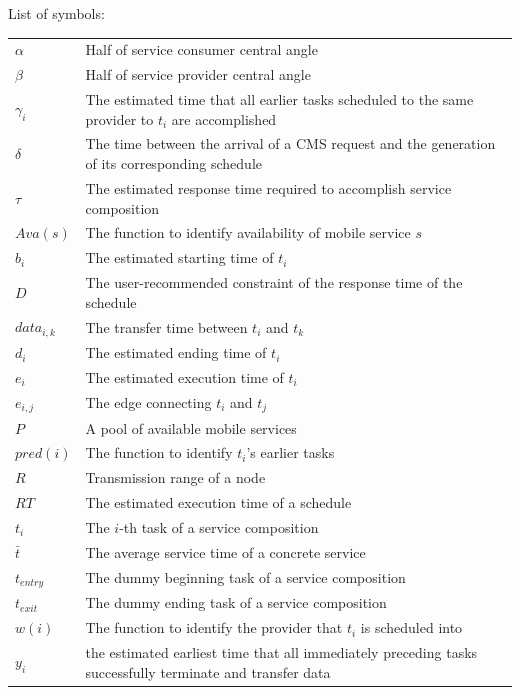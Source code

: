 \documentclass[journal]{IEEEtran}
\begin{document}
\noindent List of symbols: 
~\\

\noindent
\begin{tabular}{@{} l p{7.36cm} }
$\alpha$      &   Half of service consumer central angle \\
$\beta$       &   Half of service provider central angle \\
$\gamma_{i}$  &   The estimated time that all earlier tasks scheduled to the same provider to $t_i$ are accomplished  \\
$\delta$      &   The time between the arrival of a CMS request and the generation of its corresponding schedule \\
$\tau$        &   The estimated response time required to accomplish service composition \\
$Ava(s)$      &   The function to identify availability of mobile service $s$ \\
$b_i$         &   The estimated starting time of $t_i$ \\
$D$           &   The user-recommended constraint of the response time of the schedule \\
$data_{i,k}$  &   The transfer time between $t_i$ and $t_k$ \\
$d_i$         &   The estimated ending time of $t_i$ \\
$e_i$         &   The estimated execution time of $t_i$ \\
$e_{i,j}$     &   The edge connecting $t_i$ and $t_j$ \\
$P$           &   A pool of available mobile services \\
$pred(i)$     &   The function to identify $t_i$'s earlier tasks \\
$R$           &   Transmission range of a node \\
$RT$          &   The estimated execution time of a schedule \\
$t_i$         &   The $i$-th task of a service composition \\
$\bar{t}$     &   The average service time of a concrete service \\
$t_{entry}$   &   The dummy beginning task of a service composition \\
$t_{exit}$    &   The dummy ending task of a service composition \\
$w(i)$        &   The function to identify the provider that $t_i$ is scheduled into \\
$y_i$         &   the estimated earliest time that all immediately preceding tasks successfully terminate and transfer data \\
\end{tabular}
\end{document}
